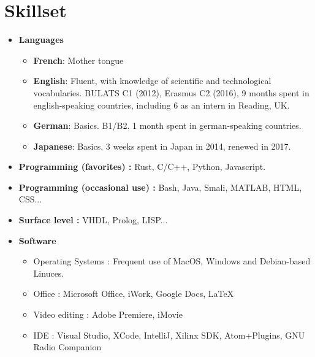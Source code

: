 \documentclass[11pt,a4paper,sans]{moderncv}        %
\begin{document}
\section{Skillset}

\vspace{6pt}

\begin{itemize}[itemsep=0em, topsep=0em, parsep=0em]

\item \textbf{Languages} 
\begin{itemize}[itemsep=0em, topsep=0em, parsep=0em]
\item \textbf{French}: Mother tongue
\item \textbf{English}: Fluent, with knowledge of scientific and technological vocabularies. BULATS C1 (2012), Erasmus C2 (2016), 9 months spent in english-speaking countries, including 6 as an intern in Reading, UK.
\item \textbf{German}: Basics. B1/B2. 1 month spent in german-speaking countries.
\item \textbf{Japanese}: Basics. 3 weeks spent in Japan in 2014, renewed in 2017.
\end{itemize}

\vspace{6pt}

\item \textbf{Programming (favorites) :} Rust, C/C++, Python, Javascript.
\item \textbf{Programming (occasional use) :} Bash, Java, Smali, MATLAB, HTML, CSS...
\item \textbf{Surface level :} VHDL, Prolog, LISP...

\vspace{6pt}

\item \textbf{Software}
\begin{itemize}[itemsep=0em, topsep=0em, parsep=0em]
\item Operating Systems : Frequent use of MacOS, Windows and Debian-based Linuces.
\item Office : Microsoft Office, iWork, Google Docs, \LaTeX
\item Video editing : Adobe Premiere, iMovie
\item IDE : Visual Studio, XCode, IntelliJ, Xilinx SDK, Atom+Plugins, GNU Radio Companion
\end{itemize}

\vspace{6pt}


\end{itemize}
\end{document}

